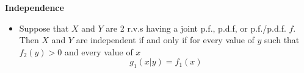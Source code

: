 \documentclass[11pt]{article}
\begin{document}
\textbf{Independence}
\begin{itemize}
    \item Suppose that $X$ and $Y$ are 2 r.v.s having a joint p.f., p.d.f, or p.f./p.d.f. $f$. 
    Then $X$ and $Y$ are independent if and only if for every value of $y$ such that $f_2(y)
    >0$ and every value of $x$
    \[g_1(x|y)=f_1(x)\]
\end{itemize}
\end{document}
